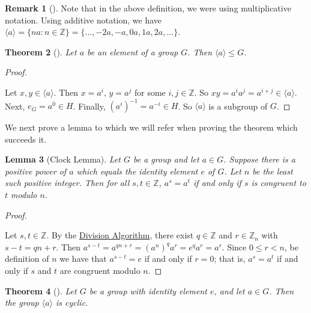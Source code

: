 \documentclass[10pt,]{book}
\theoremstyle{plain}
\newtheorem{theorem}{Theorem}[section]
\newtheorem{lemma}[theorem]{Lemma}
\theoremstyle{definition}
\theoremstyle{definition}
\newtheorem{remark}[theorem]{Remark}
\theoremstyle{definition}
\theoremstyle{definition}
\numberwithin{equation}{section}
\def\Z{\mathbb{Z}}
\newcommand{\lt}{<}
\begin{document}
\begin{remark}[]\label{remark-20}
Note that in the above definition, we were using multiplicative notation. Using additive notation, we have \(\langle a\rangle =\{na:n\in \Z\}=\{\ldots, -2a, -a, 0a, 1a, 2a, \ldots\}.\)%
\end{remark}
\begin{theorem}[{}]\label{theorem-22}
Let \(a\) be an element of a group \(G\). Then \(\langle a\rangle \leq G\).%
\end{theorem}
\begin{proof}\hypertarget{proof-21}{}
Let \(x,y\in \langle a\rangle\). Then \(x=a^i\), \(y=a^j\) for some \(i,j\in \Z\). So \(xy=a^ia^j=a^{i+j}\in \langle a\rangle\). Next, \(e_G=a^0\in H\). Finally, \((a^i)^{-1}=a^{-i}\in H\). So \(\langle a\rangle\) is a subgroup of \(G\).%
\end{proof}
We next prove a lemma to which we will refer when proving the theorem which succeeds it.%
\begin{lemma}[{Clock Lemma}]\label{clock}
Let \(G\) be a group and let \(a \in G\). Suppose there is a positive power of \(a\) which equals the identity element \(e\) of \(G\). Let \(n\) be the least such positive integer. Then for all \(s,t\in \Z\), \(a^s=a^t\) if and only if \(s\) is congruent to \(t\) modulo \(n\).%
\end{lemma}
\begin{proof}\hypertarget{proof-22}{}
Let \(s,t\in \Z\). By the \hyperref[divalg]{Division Algorithm}, there exist \(q\in \Z\) and \(r\in \Z_n\) with \(s-t=qn+r\). Then \(a^{s-t}=a^{qn+r}=(a^n)^qa^r=e^qa^r=a^r\). Since \(0\leq r\lt n\), be definition of \(n\) we have that \(a^{s-t}=e\) if and only if \(r=0\); that is, \(a^s=a^t\) if and only if \(s\) and \(t\) are congruent modulo \(n\).%
\end{proof}
\begin{theorem}[{}]\label{theorem-23}
Let \(G\) be a group with identity element \(e\), and let \(a\in G\). Then the group \(\langle a\rangle\) is cyclic.%
\end{theorem}
\end{document}
